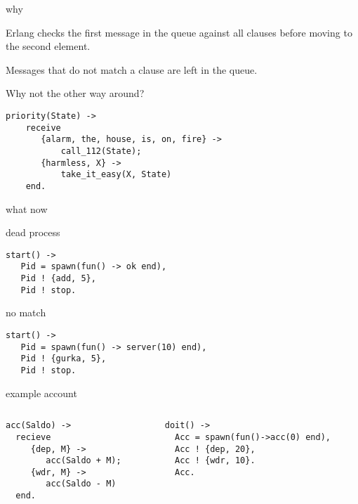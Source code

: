 \begin{frame}[fragile]{why}

Erlang checks the first message in the queue against all clauses before
moving to the second element. 

Messages that do not match a clause are left in the queue.

\pause\vspace{10pt}
Why not the other way around?

\pause\vspace{20pt}
\begin{verbatim}
priority(State) ->
    receive 
       {alarm, the, house, is, on, fire} -> 
           call_112(State);
       {harmless, X} -> 
           take_it_easy(X, State)
    end.
\end{verbatim}

\end{frame}

\begin{frame}[fragile]{what now}

\begin{block}{dead process}
  \begin{verbatim}
start() ->
   Pid = spawn(fun() -> ok end),
   Pid ! {add, 5},
   Pid ! stop.
       \end{verbatim}
\end{block}
\pause
\begin{block}{no match}
   \begin{verbatim}
start() ->
   Pid = spawn(fun() -> server(10) end),
   Pid ! {gurka, 5},
   Pid ! stop.
   \end{verbatim}
\end{block}

\end{frame}

\begin{frame}[fragile]{example account}

\begin{columns}
   \begin{column}{.4\linewidth}
     \begin{verbatim}
acc(Saldo) ->
  recieve
     {dep, M} ->
        acc(Saldo + M);
     {wdr, M} ->
        acc(Saldo - M)
  end.
     \end{verbatim}
   \end{column}
   \begin{column}{.6\linewidth}
     \begin{verbatim}
doit() ->
  Acc = spawn(fun()->acc(0) end),
  Acc ! {dep, 20},
  Acc ! {wdr, 10}.
  Acc.
     \end{verbatim}
     \vfill
   \end{column}
\end{columns}


\end{frame}

